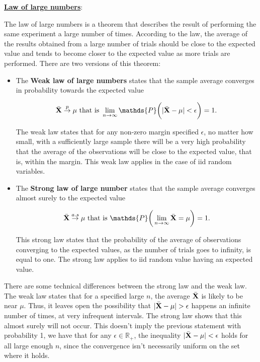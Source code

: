\documentclass{homework}
\begin{document}
\underline{\textbf{Law of large numbers}}:

The law of large numbers is a theorem that describes the result of performing the same experiment a large number of times. According to the law, the average of the results obtained from a large number of trials should be close to the expected value and tends to become closer to the expected value as more trials are performed. There are two versions of this theorem:

\begin{itemize}
    \item The \textbf{Weak law of large numbers} states that the sample average converges in probability towards the expected value 
    
    $$
     \bar{\X} \overset{p}{\rightarrow} \mu \textnormal{ that is } \lim_{n \rightarrow \infty} \mathds{P} \bigg(|\bar{\X} - \mu| < \epsilon \bigg) = 1.
    $$
    
    The weak law states that for any non-zero margin specified $\epsilon$, no matter how small, with a sufficiently large sample there will be a very high probability that the average of the observations will be close to the expected value, that is, within the margin. This weak law applies in the case of iid random variables. 
    
    \clearpage
    
    \item The \textbf{Strong law of large number} states that the sample average converges almost surely to the expected value 
    
    $$
      \bar{\X} \overset{a.s}{\rightarrow} \mu \textnormal{ that is } \mathds{P}\bigg(\lim_{n \rightarrow \infty} \bar{\X} = \mu \bigg) = 1. 
    $$
    
    This strong law states that the probability of the average of observations converging to the expected values, as the number of trials goes to infinity, is equal to one. The strong law applies to iid random value having an expected value.\\
\end{itemize}

There are some technical differences between the strong law and the weak law. The weak law states that for a specified large $n$, the average $\bar{\bf X}$ is likely to be near $\mu$. Thus, it leaves open the possibility that $|\bar{\bf X}- \mu|>\epsilon$ happens an infinite number of times, at very infrequent intervals. The strong law shows that this almost surely will not occur. This doesn't imply the previous statement with probability 1, we have that for any $\epsilon \in \mathds{R}_+$, the inequality $|\bar{\bf{X}}-\mu|<\epsilon$ holds for all large enough $n$, since the convergence isn't necessarily uniform on the set where it holds. \\
\end{document}
